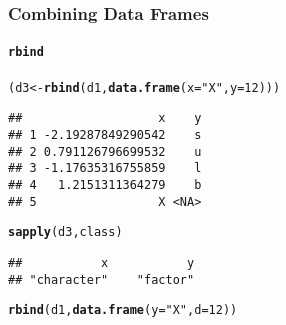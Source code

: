 \documentclass[paper=screen,mathserif]{beamer}\usepackage[]{graphicx}\usepackage[]{color}
\makeatletter
\newcommand{\hlnum}[1]{\textcolor[rgb]{0.686,0.059,0.569}{#1}}%
\newcommand{\hlstr}[1]{\textcolor[rgb]{0.192,0.494,0.8}{#1}}%
\newcommand{\hlstd}[1]{\textcolor[rgb]{0.345,0.345,0.345}{#1}}%
\newcommand{\hlkwb}[1]{\textcolor[rgb]{0.69,0.353,0.396}{#1}}%
\newcommand{\hlkwc}[1]{\textcolor[rgb]{0.333,0.667,0.333}{#1}}%
\newcommand{\hlkwd}[1]{\textcolor[rgb]{0.737,0.353,0.396}{\textbf{#1}}}%
\newenvironment{kframe}{%
 \def\at@end@of@kframe{}%
 \ifinner\ifhmode%
  \def\at@end@of@kframe{\end{minipage}}%
  \begin{minipage}{\columnwidth}%
 \fi\fi%
 \def\FrameCommand##1{\hskip\@totalleftmargin \hskip-\fboxsep
 \colorbox{shadecolor}{##1}\hskip-\fboxsep
     \hskip-\linewidth \hskip-\@totalleftmargin \hskip\columnwidth}%
 \MakeFramed {\advance\hsize-\width
   \@totalleftmargin\z@ \linewidth\hsize
   \@setminipage}}%
 {\par\unskip\endMakeFramed%
 \at@end@of@kframe}
\newenvironment{knitrout}{}{} %
\newcommand{\ft}[1]{\frametitle{#1}}
\newcommand{\fst}[1]{\framesubtitle{#1}}
\makeatother
\begin{document}
\begin{frame}[fragile]
  \ft{Combining Data Frames}  
  \fst{{\tt rbind}}
\begin{knitrout}\tiny
{}\color{fgcolor}\begin{kframe}
\begin{alltt}
\hlstd{(d3} \hlkwb{<-} \hlkwd{rbind}\hlstd{(d1,} \hlkwd{data.frame}\hlstd{(}\hlkwc{x} \hlstd{=} \hlstr{"X"}\hlstd{,} \hlkwc{y} \hlstd{=} \hlnum{12}\hlstd{)))}
\end{alltt}


{\ttfamily\noindent\color{warningcolor}{\#\# Warning in `[<-.factor`(`*tmp*`, ri, value = structure(c(3L, 4L, 2L, 1L, : invalid factor level, NA generated}}\begin{verbatim}
##                   x    y
## 1 -2.19287849290542    s
## 2 0.791126796699532    u
## 3 -1.17635316755859    l
## 4   1.2151311364279    b
## 5                 X <NA>
\end{verbatim}
\begin{alltt}
\hlkwd{sapply}\hlstd{(d3, class)}
\end{alltt}
\begin{verbatim}
##           x           y 
## "character"    "factor"
\end{verbatim}
\end{kframe}
\end{knitrout}
\begin{knitrout}\scriptsize
{}\color{fgcolor}\begin{kframe}
\begin{alltt}
\hlkwd{rbind}\hlstd{(d1,} \hlkwd{data.frame}\hlstd{(}\hlkwc{y} \hlstd{=} \hlstr{"X"}\hlstd{,} \hlkwc{d} \hlstd{=} \hlnum{12}\hlstd{))}
\end{alltt}


{\ttfamily\noindent\bfseries\color{errorcolor}{\#\# Error in match.names(clabs, names(xi)): names do not match previous names}}\end{kframe}
\end{knitrout}

\end{frame}
\end{document}
